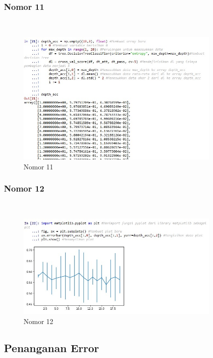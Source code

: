 \subsubsection{Nomor 11}
\hfill\\

\begin{figure}[H]
\centerline{\includegraphics[width=10cm]{figures/1174057/chapter2/21.jpg}}
\caption{Nomor 11}
\label{labelgambar}
\end{figure}

\subsubsection{Nomor 12}
\hfill\\

\begin{figure}[H]
\centerline{\includegraphics[width=10cm]{figures/1174057/chapter2/22.jpg}}
\caption{Nomor 12}
\label{labelgambar}
\end{figure}

\subsection{Penanganan Error}
